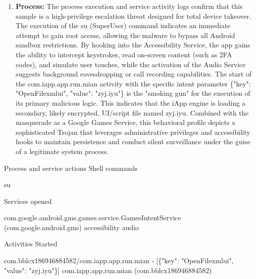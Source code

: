 \documentclass[
]{article}
\newenvironment{Shaded}{}{}
\newcommand{\NormalTok}[1]{#1}
\begin{document}
\begin{enumerate}
\def\labelenumi{\arabic{enumi}.}
\item
  \textbf{Process:} The process execution and service activity logs
  confirm that this sample is a high-privilege escalation threat
  designed for total device takeover. The execution of the su
  (SuperUser) command indicates an immediate attempt to gain root
  access, allowing the malware to bypass all Android sandbox
  restrictions. By hooking into the Accessibility Service, the app gains
  the ability to intercept keystrokes, read on-screen content (such as
  2FA codes), and simulate user touches, while the activation of the
  Audio Service suggests background eavesdropping or call recording
  capabilities. The start of the com.iapp.app.run.mian activity with the
  specific intent parameter \{"key": "OpenFilexmlui", "value":
  "zyj.iyu"\} is the "smoking gun" for the execution of its primary
  malicious logic. This indicates that the iApp engine is loading a
  secondary, likely encrypted, UI/script file named zyj.iyu. Combined
  with the masquerade as a Google Games Service, this behavioral profile
  depicts a sophisticated Trojan that leverages administrative
  privileges and accessibility hooks to maintain persistence and conduct
  silent surveillance under the guise of a legitimate system process.
\end{enumerate}

\begin{Shaded}
\begin{Highlighting}[]
\NormalTok{Process and service actions}
\NormalTok{Shell commands}

\NormalTok{    su}

\NormalTok{Services opened}

\NormalTok{    com.google.android.gms.games.service.GamesIntentService (com.google.android.gms)}
\NormalTok{    accessibility}
\NormalTok{    audio}

\NormalTok{Activities Started}

\NormalTok{    com.bblcx186946884582/com.iapp.app.run.mian {-} [\{"key": "OpenFilexmlui", "value": "zyj.iyu"\}]}
\NormalTok{    com.iapp.app.run.mian (com.bblcx186946884582)}
\end{Highlighting}
\end{Shaded}
\end{document}
